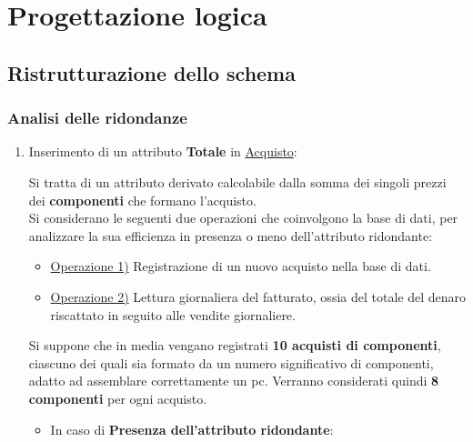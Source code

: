 \section{Progettazione logica}

\subsection{Ristrutturazione dello schema}

\subsubsection{Analisi delle ridondanze}
\begin{enumerate}

\item Inserimento di un attributo \textbf{Totale} in \underline{Acquisto}:

Si tratta di un attributo derivato calcolabile dalla somma dei singoli prezzi dei \textbf{componenti} che formano l'acquisto. \\
Si considerano le seguenti due operazioni che coinvolgono la base di dati, per analizzare la sua efficienza in presenza o meno dell'attributo ridondante:\\

\begin{itemize}
\item \underline{Operazione 1)} Registrazione di un nuovo acquisto nella base di dati.
\item \underline{Operazione 2)} Lettura giornaliera del fatturato, ossia del totale del denaro riscattato in seguito alle vendite giornaliere.\\
\end{itemize}

Si suppone che in media vengano registrati \textbf{10 acquisti di componenti}, ciascuno dei quali sia formato da un numero significativo di componenti, adatto ad assemblare correttamente un pc. Verranno considerati quindi \textbf{8 componenti} per ogni acquisto.\\

\begin{itemize}

\item In caso di \textbf{Presenza dell'attributo ridondante}:\\


\end{itemize}
\end{enumerate}
